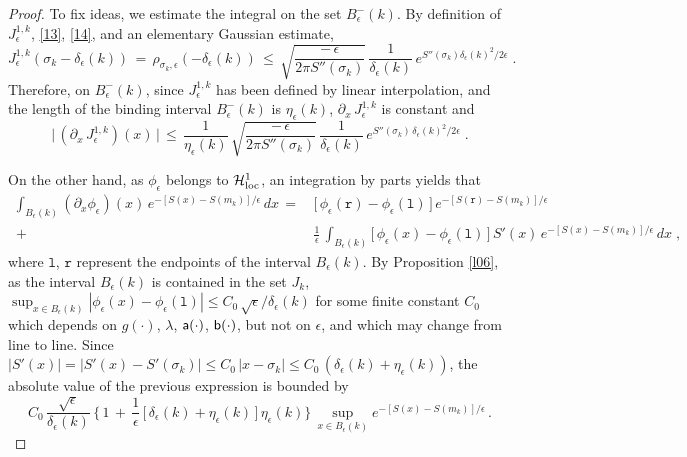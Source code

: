 \documentclass[reqno]{amsart}
\theoremstyle{plain}
\theoremstyle{definition}
\newcommand{\mc}[1]{{\mathcal #1}}
\newcommand{\mss}[1]{{\textsf #1}}
\newcommand{\mtt}[1]{{\mathtt #1}}
\newcounter{as}[section]
\newcommand{\<}{\langle}
\renewcommand{\>}{\rangle}
\begin{document}
\begin{proof}
To fix ideas, we estimate the integral on the set
$B^-_\epsilon(k)$. By definition of $J^{1,k}_\epsilon$,
\eqref{13}, \eqref{14}, and an elementary Gaussian estimate,
\begin{equation*}
J^{1,k}_{\epsilon} (\sigma_k - \delta_\epsilon(k)) \,=\, 
\rho_{\sigma_k,\epsilon}(- \delta_\epsilon(k)) \,\le\,
\sqrt{\frac{-\, \epsilon}{2\pi S''(\sigma_k)} }\,
\frac{1}{\delta_\epsilon(k)} \, 
e^{ S''(\sigma_k) \delta_\epsilon( k)^2/2 \epsilon }\;.
\end{equation*}
Therefore, on $B^-_\epsilon(k)$, since $J^{1,k}_\epsilon$ has been
defined by linear interpolation, and the length of the binding
interval $B^-_\epsilon(k)$ is $\eta_\epsilon(k)$, $\partial_x \,
J^{1,k}_{\epsilon}$ is constant and 
\begin{equation*}
\big|\, (\partial_x \,  J^{1,k}_{\epsilon}) (x) \,\big|\,\le\,
\frac{1}{\eta_\epsilon(k)}\, 
\sqrt{\frac{- \, \epsilon}{2\pi S''(\sigma_k)}} \,
\frac{1}{\delta_\epsilon(k)}\, 
e^{S''(\sigma_k) \, \delta_\epsilon(k)^2/2 \epsilon }\;.
\end{equation*}

On the other hand, as $\phi_\epsilon$ belongs to $\mc H^1_{\rm loc}$,
an integration by parts yields that
\begin{equation*}
\begin{aligned}
\int_{B_\epsilon  (k)} (\partial_x \phi_{\epsilon}) (x) \,
e^{-[S(x)-S(m_k)]/\epsilon} \, dx
\,= & \, \big[\, \phi_{\epsilon} (\mtt r) - \phi_{\epsilon} (\mtt l)\,\big]
\, e^{-[S(\mtt r)-S(m_k)]/\epsilon}
\\
\,+ & \, \frac{1}{\epsilon}\, 
\int_{B_\epsilon  (k)} \big[ \, \phi_{\epsilon} (x) - \phi_{\epsilon}
(\mtt l)\, \big] \,
S'(x)\, e^{-[S(x)-S(m_k)]/\epsilon} \, dx
\;,
\end{aligned}
\end{equation*}
where $\mtt l$, $\mtt r$ represent the endpoints of the interval
$B_\epsilon (k)$.  By Proposition \ref{l06}, as the interval
$B_\epsilon (k)$ is contained in the set $J_k$,
$\sup_{x\in B_\epsilon (k)} |\phi_{\epsilon} (x) -
\phi_{\epsilon} (\mtt l)| \le C_0 \,
\sqrt{\epsilon}/\delta_\epsilon(k)$ for some finite constant $C_0$
which depends on $g(\cdot)$, $\lambda$, $\mss a(\cdot)$,
$\mss b(\cdot)$, but not on $\epsilon$, and which may change from line
to line. Since
$|S'(x)| = | S'(x) - S'(\sigma_k)|\le C_0\, |x-\sigma_k| \le C_0\,
(\delta_\epsilon(k) + \eta_\epsilon(k))$, the absolute value of the
previous expression is bounded by
\begin{equation*}
C_0 \, \frac{\sqrt{\epsilon}}{\delta_\epsilon(k)} \, \Big\{\, 1  \,+\,
\frac{1}{\epsilon}\, \big[\, \delta_\epsilon(k) + \eta_\epsilon(k)\, \big]\,
\eta_\epsilon(k) \Big\} \, \sup_{x\in B_\epsilon  (k)}
e^{-[S(x)-S(m_k)]/\epsilon}\,.
\end{equation*}


\end{proof}
\end{document}
